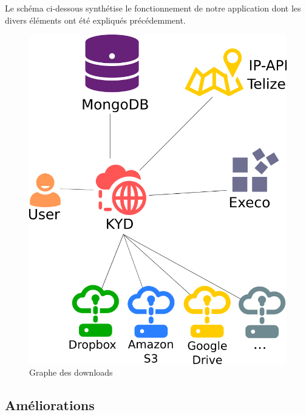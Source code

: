 \documentclass[10pt]{article}
\begin{document}
Le schéma ci-dessous synthétise le fonctionnement de notre application
dont les divers éléments ont été expliqués précédemment.

\begin{figure}[h]
\centering
\includegraphics[scale=0.3]{architecture.png}
\caption{Graphe des downloads}
\label{fig:Graphe des downloads}
\end{figure}

\subsection{Améliorations}
\end{document}
